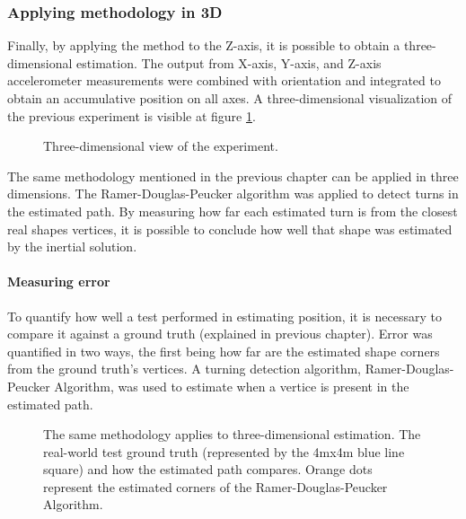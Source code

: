 \newpage

\subsubsection{Applying methodology in 3D}

Finally, by applying the method to the Z-axis, it is possible to obtain a  three-dimensional estimation. The output from X-axis, Y-axis, and Z-axis accelerometer measurements were combined with orientation and integrated to obtain an accumulative position on all axes.
A three-dimensional visualization of the previous experiment is visible at figure \ref{fig:square3D}.

\begin{figure}[!h]
  \centering
  \resizebox{0.8\linewidth}{!}{}
  \caption{Three-dimensional view of the experiment.}
  \label{fig:square3D}
\end{figure}

The same methodology mentioned in the previous chapter can be applied in three dimensions. The Ramer-Douglas-Peucker algorithm was applied to detect turns in the estimated path. By measuring how far each estimated turn is from the closest real shapes vertices, it is possible to conclude how well that shape was estimated by the inertial solution.

\paragraph{Measuring error}


To quantify how well a test performed in estimating position, it is necessary to compare it against a ground truth (explained in previous chapter). Error was quantified in two ways, the first being how far are the estimated shape corners from the ground truth's vertices. A turning detection algorithm, Ramer-Douglas-Peucker Algorithm, was used to estimate when a vertice is present in the estimated path.


\begin{figure}[!h]
  \centering
  \resizebox{0.8\linewidth}{!}{}
  \caption{The same methodology applies to three-dimensional estimation. The real-world test ground truth (represented by the 4mx4m  blue line square) and how the estimated path compares. Orange dots represent the estimated corners of the Ramer-Douglas-Peucker Algorithm.}
  \label{fig:square3D_truth}
\end{figure}

